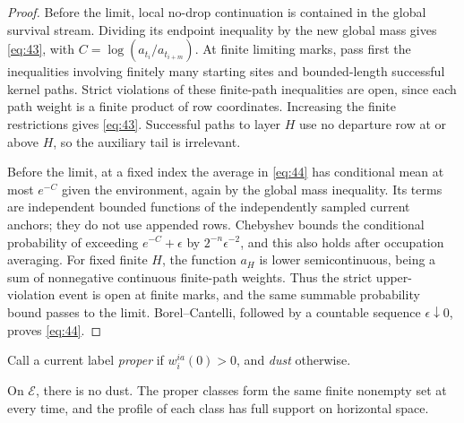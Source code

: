 \begin{proof}
Before the limit, local no-drop continuation is contained in the global
survival stream. Dividing its endpoint inequality by the new global
mass gives \eqref{eq:43}, with
\(C=\log(a_{t_i}/a_{t_{i+m}})\). At finite limiting marks, pass first
the inequalities involving finitely many starting sites and
bounded-length successful kernel paths. Strict violations of these
finite-path inequalities are open, since each path weight is a finite
product of row coordinates. Increasing the finite restrictions gives
\eqref{eq:43}. Successful paths to layer \(H\) use no departure row
at or above \(H\), so the auxiliary tail is irrelevant.

Before the limit, at a fixed index the average in \eqref{eq:44} has
conditional mean at most \(e^{-C}\) given the environment, again by
the global mass inequality. Its terms are independent bounded
functions of the independently sampled current anchors; they do not
use appended rows. Chebyshev bounds the conditional probability of
exceeding \(e^{-C}+\epsilon\) by \(2^{-n}\epsilon^{-2}\), and this
also holds after occupation averaging. For fixed finite \(H\), the
function \(a_H\) is lower semicontinuous, being a sum of nonnegative
continuous finite-path weights. Thus the strict upper-violation event
is open at finite marks, and the same summable probability bound
passes to the limit. Borel--Cantelli, followed by a countable sequence
\(\epsilon\downarrow0\), proves \eqref{eq:44}.
\end{proof}

Call a current label \emph{proper} if \(w_i^{ia}(0)>0\), and
\emph{dust} otherwise.

\begin{proposition}\label{profile-classes}
On \(\mathcal E\), there is no dust. The proper classes form the same
finite nonempty set at every time, and the profile of each class has
full support on horizontal space.
\end{proposition}

